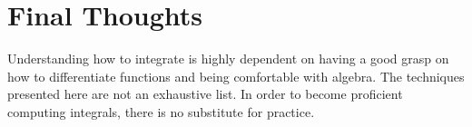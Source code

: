 \documentclass[nooutcomes]{ximera}
\begin{document}
\section{Final Thoughts}
Understanding how to integrate is highly dependent on having a good grasp on how to differentiate functions and being comfortable with algebra. The techniques presented here are not an exhaustive list.  In order to become proficient computing integrals, there is no substitute for practice.  
%
\end{document}
